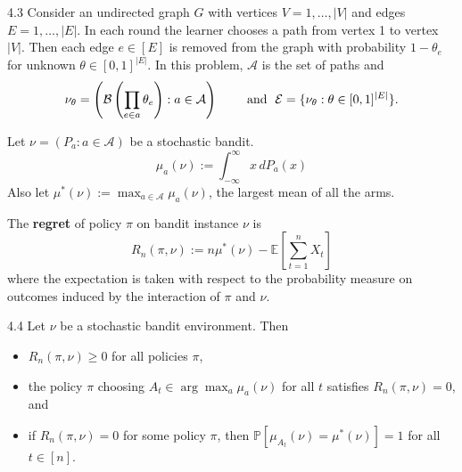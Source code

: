 \documentclass[10pt]{article}
\newenvironment{lemma*}[1]{%
  \IfBlankTF{#1}
    {\renewcommand{\themanuallemmainner}{\unskip}}
    {\renewcommand\themanuallemmainner{#1}}%
  \manuallemmainner
}{\endmanuallemmainner}
\theoremstyle{definition}
\newenvironment{example*}[1]{%
  \IfBlankTF{#1}
    {\renewcommand{\themanualexampleinner}{\unskip}}
    {\renewcommand\themanualexampleinner{#1}}%
  \manualexampleinner
}{\endmanualexampleinner}
\newenvironment{definition*}[1]{%
  \IfBlankTF{#1}
    {\renewcommand{\themanualdefinitioninner}{\unskip}}
    {\renewcommand\themanualdefinitioninner{#1}}%
  \manualdefinitioninner
}{\endmanualdefinitioninner}
\begin{document}
\begin{example*}{4.3}
    Consider an undirected graph $G$ with vertices $V={1, \ldots, |V|}$ and edges $E={1, \ldots, |E|}$.
    In each round the learner chooses a path from vertex 1 to vertex $|V|$.
    Then each edge $e \in [E]$ is removed from the graph with probability $1-\theta_e$ for unknown $\theta \in [0,1]^{|E|}$.
    In this problem, $\mathcal{A}$ is the set of paths and
    \begin{equation*}
        \nu_\theta = \left( \mathcal{B}\left(\prod_{e \in a} \theta_e\right) : a \in \mathcal{A} \right) \hspace{2em} \text{ and } \hspace{0.3em} \mathcal{E} = \{ \nu_\theta : \theta \in [0,1]^{|E|} \}.
    \end{equation*}
\end{example*}

\begin{definition*}{}
    Let $\nu = (P_a : a \in \mathcal{A})$ be a stochastic bandit.
    \begin{equation*}
        \mu_a(\nu) := \int_{-\infty}^{\infty} x \, dP_a(x)
    \end{equation*}
    Also let $\mu^*(\nu) := \max_{a \in \mathcal{A}} \mu_a(\nu)$, the largest mean of all the arms.
\end{definition*}

\begin{definition*}{}
    The \textbf{regret} of policy $\pi$ on bandit instance $\nu$ is
    \begin{equation*}
        R_n (\pi, \nu) := n \mu^*(\nu) - \mathbb{E}\left[\sum_{t=1}^n X_t\right]
    \end{equation*}
    where the expectation is taken with respect to the probability measure on outcomes induced by the interaction of $\pi$ and $\nu$.
\end{definition*}

\begin{lemma*}{4.4}
    Let $\nu$ be a stochastic bandit environment. Then
    \begin{itemize}
        \item $R_n(\pi, \nu) \geq 0$ for all policies $\pi$,
        \item the policy $\pi$ choosing $A_t \in \arg\max_a \mu_a(\nu)$ for all $t$ satisfies $R_n(\pi, \nu) = 0$, and
        \item if $R_n(\pi, \nu) = 0$ for some policy $\pi$, then $\mathbb{P} \left[\mu_{A_t}(\nu) = \mu^*(\nu) \right] = 1$ for all $t \in [n]$.
    \end{itemize}
\end{lemma*}
\end{document}
